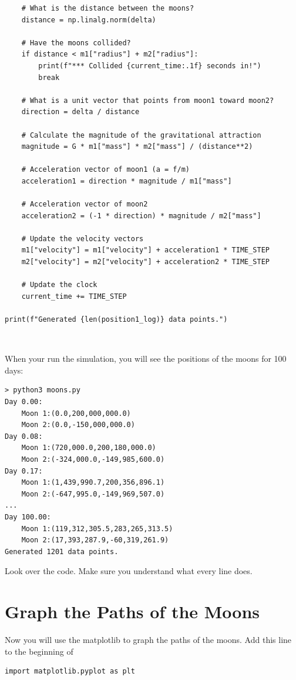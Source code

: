 \begin{verbatim}
    # What is the distance between the moons?
    distance = np.linalg.norm(delta)

    # Have the moons collided?
    if distance < m1["radius"] + m2["radius"]:
        print(f"*** Collided {current_time:.1f} seconds in!")
        break

    # What is a unit vector that points from moon1 toward moon2?
    direction = delta / distance

    # Calculate the magnitude of the gravitational attraction
    magnitude = G * m1["mass"] * m2["mass"] / (distance**2)

    # Acceleration vector of moon1 (a = f/m)
    acceleration1 = direction * magnitude / m1["mass"]

    # Acceleration vector of moon2
    acceleration2 = (-1 * direction) * magnitude / m2["mass"]

    # Update the velocity vectors
    m1["velocity"] = m1["velocity"] + acceleration1 * TIME_STEP
    m2["velocity"] = m2["velocity"] + acceleration2 * TIME_STEP

    # Update the clock
    current_time += TIME_STEP

print(f"Generated {len(position1_log)} data points.")
\end{verbatim}\

When your run the simulation,  you will see the positions of the moons for 100 days:
\begin{verbatim}
> python3 moons.py 
Day 0.00:
	Moon 1:(0.0,200,000,000.0)
	Moon 2:(0.0,-150,000,000.0)
Day 0.08:
	Moon 1:(720,000.0,200,180,000.0)
	Moon 2:(-324,000.0,-149,985,600.0)
Day 0.17:
	Moon 1:(1,439,990.7,200,356,896.1)
	Moon 2:(-647,995.0,-149,969,507.0)
...
Day 100.00:
	Moon 1:(119,312,305.5,283,265,313.5)
	Moon 2:(17,393,287.9,-60,319,261.9)
Generated 1201 data points.
\end{verbatim}

Look over the code.   Make sure you understand what every line does.

\section{Graph the Paths of the Moons}

Now you will use the matplotlib to graph the paths of the moons.   Add this line to the beginning of 

\begin{verbatim}
import matplotlib.pyplot as plt
\end{verbatim}


